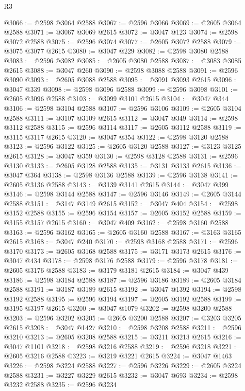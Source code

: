 \begin{lexlean}{R3}
\begin{coremodule}
@3066 := @2598 @3064 @2588
@3067 := @2596 @3066
@3069 := @2605 @3064 @2588
@3071 := @3067 @3069 @2615
@3072 := @3047 @123
@3074 := @2598 @3072 @2588
@3075 := @2596 @3074
@3077 := @2605 @3072 @2588
@3079 := @3075 @3077 @2615
@3080 := @3047 @229
@3082 := @2598 @3080 @2588
@3083 := @2596 @3082
@3085 := @2605 @3080 @2588
@3087 := @3083 @3085 @2615
@3088 := @3047 @260
@3090 := @2598 @3088 @2588
@3091 := @2596 @3090
@3093 := @2605 @3088 @2588
@3095 := @3091 @3093 @2615
@3096 := @3047 @339
@3098 := @2598 @3096 @2588
@3099 := @2596 @3098
@3101 := @2605 @3096 @2588
@3103 := @3099 @3101 @2615
@3104 := @3047 @344
@3106 := @2598 @3104 @2588
@3107 := @2596 @3106
@3109 := @2605 @3104 @2588
@3111 := @3107 @3109 @2615
@3112 := @3047 @349
@3114 := @2598 @3112 @2588
@3115 := @2596 @3114
@3117 := @2605 @3112 @2588
@3119 := @3115 @3117 @2615
@3120 := @3047 @354
@3122 := @2598 @3120 @2588
@3123 := @2596 @3122
@3125 := @2605 @3120 @2588
@3127 := @3123 @3125 @2615
@3128 := @3047 @359
@3130 := @2598 @3128 @2588
@3131 := @2596 @3130
@3133 := @2605 @3128 @2588
@3135 := @3131 @3133 @2615
@3136 := @3047 @364
@3138 := @2598 @3136 @2588
@3139 := @2596 @3138
@3141 := @2605 @3136 @2588
@3143 := @3139 @3141 @2615
@3144 := @3047 @399
@3146 := @2598 @3144 @2588
@3147 := @2596 @3146
@3149 := @2605 @3144 @2588
@3151 := @3147 @3149 @2615
@3152 := @3047 @404
@3154 := @2598 @3152 @2588
@3155 := @2596 @3154
@3157 := @2605 @3152 @2588
@3159 := @3155 @3157 @2615
@3160 := @3047 @409
@3162 := @2598 @3160 @2588
@3163 := @2596 @3162
@3165 := @2605 @3160 @2588
@3167 := @3163 @3165 @2615
@3168 := @3047 @240
@3170 := @2598 @3168 @2588
@3171 := @2596 @3170
@3173 := @2605 @3168 @2588
@3175 := @3171 @3173 @2615
@3176 := @3047 @434
@3178 := @2598 @3176 @2588
@3179 := @2596 @3178
@3181 := @2605 @3176 @2588
@3183 := @3179 @3181 @2615
@3184 := @3047 @439
@3186 := @2598 @3184 @2588
@3187 := @2596 @3186
@3189 := @2605 @3184 @2588
@3191 := @3187 @3189 @2615
@3192 := @3047 @1392
@3194 := @2598 @3192 @2588
@3195 := @2596 @3194
@3197 := @2605 @3192 @2588
@3199 := @3195 @3197 @2615
@3200 := @3047 @1079
@3202 := @2598 @3200 @2588
@3203 := @2596 @3202
@3205 := @2605 @3200 @2588
@3207 := @3203 @3205 @2615
@3208 := @3047 @1427
@3210 := @2598 @3208 @2588
@3211 := @2596 @3210
@3213 := @2605 @3208 @2588
@3215 := @3211 @3213 @2615
@3216 := @3047 @1101
@3218 := @2598 @3216 @2588
@3219 := @2596 @3218
@3221 := @2605 @3216 @2588
@3223 := @3219 @3221 @2615
@3224 := @3047 @1463
@3226 := @2598 @3224 @2588
@3227 := @2596 @3226
@3229 := @2605 @3224 @2588
@3231 := @3227 @3229 @2615
@3232 := @3047 @693
@3234 := @2598 @3232 @2588
@3235 := @2596 @3234

\end{coremodule}
\end{lexlean}
